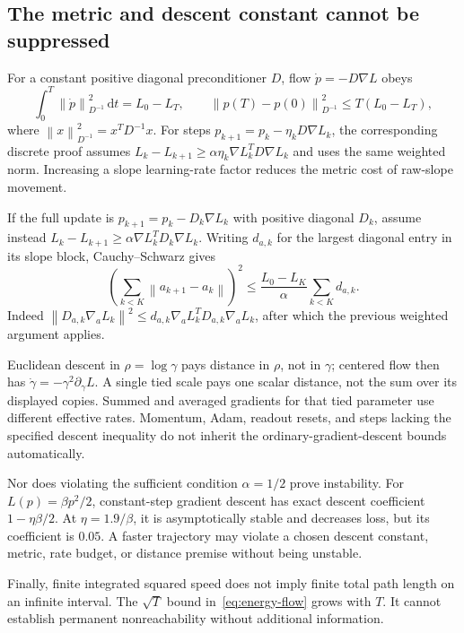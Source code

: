 \documentclass[11pt]{article}
\theoremstyle{remark}
\newcommand{\norm}[1]{\left\lVert #1\right\rVert}
\newcommand{\dd}{\,\mathrm{d}}
\begin{document}
\subsection{The metric and descent constant cannot be suppressed}

For a constant positive diagonal preconditioner $D$, flow $\dot p=-D\nabla L$ obeys
\begin{equation}
 \int_0^T\norm{\dot p}_{D^{-1}}^2\dd t=L_0-L_T,
 \qquad
 \norm{p(T)-p(0)}_{D^{-1}}^2\leq T(L_0-L_T),
\end{equation}
where $\norm{x}_{D^{-1}}^2=x^TD^{-1}x$. For steps $p_{k+1}=p_k-\eta_kD\nabla L_k$, the corresponding discrete proof assumes
$L_k-L_{k+1}\geq\alpha\eta_k\nabla L_k^TD\nabla L_k$ and uses the same weighted norm. Increasing a slope learning-rate factor reduces the metric cost of raw-slope movement.

If the full update is $p_{k+1}=p_k-D_k\nabla L_k$ with positive diagonal $D_k$, assume instead $L_k-L_{k+1}\geq\alpha\nabla L_k^TD_k\nabla L_k$. Writing $d_{a,k}$ for the largest diagonal entry in its slope block, Cauchy--Schwarz gives
\begin{equation}
 \left(\sum_{k<K}\norm{a_{k+1}-a_k}\right)^2
 \leq\frac{L_0-L_K}{\alpha}\sum_{k<K}d_{a,k}.
\end{equation}
Indeed $\norm{D_{a,k}\nabla_aL_k}^2\leq d_{a,k}\nabla_aL_k^TD_{a,k}\nabla_aL_k$, after which the previous weighted argument applies.

Euclidean descent in $\rho=\log\gamma$ pays distance in $\rho$, not in $\gamma$; centered flow then has $\dot\gamma=-\gamma^2\partial_\gamma L$. A single tied scale pays one scalar distance, not the sum over its displayed copies. Summed and averaged gradients for that tied parameter use different effective rates. Momentum, Adam, readout resets, and steps lacking the specified descent inequality do not inherit the ordinary-gradient-descent bounds automatically.

Nor does violating the sufficient condition $\alpha=1/2$ prove instability. For $L(p)=\beta p^2/2$, constant-step gradient descent has exact descent coefficient $1-\eta\beta/2$. At $\eta=1.9/\beta$, it is asymptotically stable and decreases loss, but its coefficient is $0.05$. A faster trajectory may violate a chosen descent constant, metric, rate budget, or distance premise without being unstable.

Finally, finite integrated squared speed does not imply finite total path length on an infinite interval. The $\sqrt{T}$ bound in~\eqref{eq:energy-flow} grows with $T$. It cannot establish permanent nonreachability without additional information.
\end{document}
